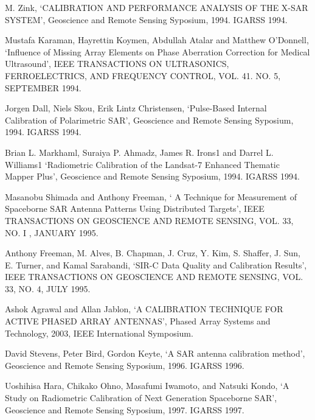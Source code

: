 \documentclass[a4paper,10pt]{article}
\begin{document}
\begin{enumerate}[ {[}1{]} ]
		\item \label{ppr:classic2} M. Zink, \enquote*{CALIBRATION AND 
		PERFORMANCE ANALYSIS OF THE X-SAR SYSTEM}, Geoscience and Remote Sensing
		Syposium, 1994. IGARSS 1994.
		
		\item Mustafa Karaman, Hayrettin Koymen, Abdullah Atalar and Matthew 
		O’Donnell, \enquote*{Influence of Missing Array Elements on Phase 
		Aberration Correction for Medical Ultrasound}, IEEE TRANSACTIONS ON
		ULTRASONICS, FERROELECTRICS, AND FREQUENCY CONTROL, VOL. 41. NO. 5, 
		SEPTEMBER 1994.
		
		\item \label{ppr:classic3} Jorgen Dall, Niels Skou, Erik Lintz 
		Christensen, \enquote*{Pulse-Based Internal Calibration of Polarimetric
		SAR}, Geoscience and Remote Sensing Syposium, 1994. IGARSS 1994.

		\item \label{ppr:rad3} Brian L. Markhaml, Suraiya P. Ahmadz, James R. 
		Irons1 and Darrel L. Williams1 \enquote*{Radiometric Calibration of the
		Landsat-7 Enhanced Thematic Mapper Plus}, Geoscience and Remote Sensing
		Syposium, 1994. IGARSS 1994.
		
		\item \label{ppr:dist1} Masanobu Shimada and Anthony Freeman, \enquote*{
		A Technique for Measurement of Spaceborne SAR Antenna Patterns Using 
		Distributed Targets}, IEEE TRANSACTIONS ON GEOSCIENCE AND REMOTE 
		SENSING, VOL. 33, NO. I , JANUARY 1995.
		
		\item \label{ppr:abs-rad-ical1}Anthony Freeman, M. Alves, B. Chapman, J.
		Cruz, Y. Kim, S. Shaffer, J. Sun, E. Turner, and Kamal Sarabandi, 
		\enquote*{SIR-C Data Quality and Calibration Results}, IEEE TRANSACTIONS
		ON GEOSCIENCE AND REMOTE SENSING, VOL. 33, NO. 4, JULY 1995.
		
		\item \label{ppr:mutual1} Ashok Agrawal and Allan Jablon, \enquote*{A 
		CALIBRATION TECHNIQUE FOR ACTIVE PHASED ARRAY ANTENNAS}, Phased Array 
		Systems and Technology, 2003, IEEE International Symposium.
		
		\item \label{ppr:puncTrgt2} David Stevens, Peter Bird, Gordon Keyte, 
		\enquote*{A SAR antenna calibration method}, Geoscience and Remote 
		Sensing Syposium, 1996. IGARSS 1996.
		
		\item \label{ppr:rev1} Uoshihisa Hara, Chikako Ohno, Masafumi Iwamoto, 
		and Natsuki Kondo, \enquote*{A Study on Radiometric Calibration of Next
		Generation Spaceborne SAR}, Geoscience and Remote Sensing Syposium, 
		1997. IGARSS 1997.


\end{enumerate}
\end{document}
